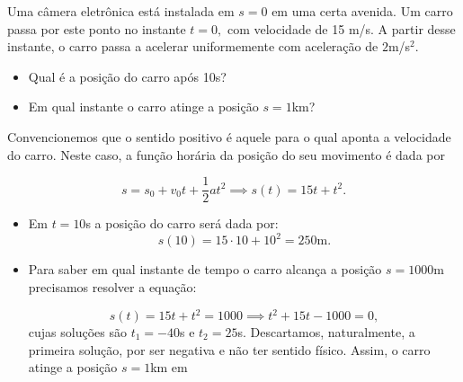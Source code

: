 \begin{exemplo}[Nível I]\label{exemplo_cinematicaescalar_funcaoposicaomuvex01}


Uma câmera eletrônica está instalada em $s=0$ em uma certa avenida. Um carro passa por este ponto no instante $t=0,$ com velocidade de 15 m/s. A partir desse instante, o carro passa a acelerar uniformemente com aceleração de $2$m/s$^2$.

\begin{itemize}
    \item [(a)] Qual é a posição do carro após 10s?
    \item [(b)] Em qual instante o carro atinge a posição $s=1$km?
\end{itemize}



\resolucao



Convencionemos que o sentido positivo é aquele para o qual aponta a velocidade do carro. Neste caso, a função horária da posição do seu movimento é dada por

$$ s= s_0+v_0t+\dfrac{1}{2}at^2 \implies \boxed{ s(t)=15t+t^2.}$$

\begin{itemize}
    \item [(a)] Em $t=10$s a posição do carro será dada por:
    $$ s(10)=15 \cdot 10 + 10^2 = \boxed{250 \text{m}.}$$

    \item [(b)] Para saber em qual instante de tempo o carro alcança a posição $s=1000$m precisamos resolver a equação:

    $$ s(t)= 15t+t^2 = 1000 \implies t^2+15t-1000=0,$$
    cujas soluções são $t_1=-40$s e $t_2=25$s. Descartamos, naturalmente, a primeira solução, por ser negativa e não ter sentido físico. Assim, o carro atinge a posição $s=1$km em 
\end{itemize}

\end{exemplo}


\vspace{0.3cm}





